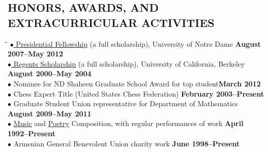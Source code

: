 \documentclass{resume}
\begin{document}
\begin{resume}
	\section{HONORS, AWARDS, AND EXTRACURRICULAR ACTIVITIES} 
	\vspace{-0.1in}
	\begin{tabbing}
	  \hspace{2.3in}\= \hspace{2.6in}\= \kill
    \href{http://graduateschool.nd.edu/admissions/financial-support/prestigious-fellowships/presidential-fellowships-arthur-j-schmitt-fellowships/}{$\bullet$ Presidential
    Fellowship} (a full scholarship), University of Notre Dame \>\> \textbf{August 2007--May 2012} \\
    \href{http://students.berkeley.edu/finaid/undergraduates/types_regents.htm}{$\bullet$ Regents
    Scholarship} (a full scholarship), University of California, 
    Berkeley \>\> \textbf{August 2000--May 2004} \\
$\bullet$ Nominee for ND Shaheen Graduate School Award for top student\>\>\textbf{March 2012}
\\
    $\bullet$ Chess Expert Title (United States Chess Federation) \>\>\textbf{February 2003--Present}
    \\
 $\bullet$ Graduate Student Union representative for Department of Mathematics \>\>\textbf{August 2009--May 2011}\\
    $\bullet$ \href{http://davidkarapetyan.com/music.php}{Music} and
    \href{http://davidkarapetyan.com/poetry.php}{Poetry} Composition, with regular
    performances of work \>\> \textbf{April 1992--Present}\\
    $\bullet$ Armenian General Benevolent Union charity work \>\> \textbf{June 1998--Present}\\
      \end{tabbing}

\end{resume}
\end{document}
